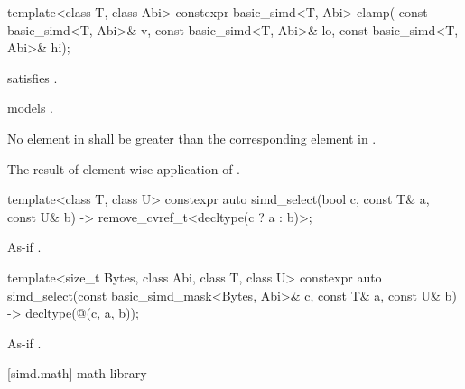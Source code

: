 \begin{itemdecl}
template<class T, class Abi>
  constexpr basic_simd<T, Abi> clamp(
    const basic_simd<T, Abi>& v, const basic_simd<T, Abi>& lo, const basic_simd<T, Abi>& hi);
\end{itemdecl}

\begin{itemdescr}
  \pnum\constraints
   satisfies .

  \pnum\expects
   models .

  \pnum\expects
  No element in  shall be greater than the corresponding element in .

  \pnum\returns
  The result of element-wise application of  \foralli.
\end{itemdescr}

\begin{itemdecl}
  template<class T, class U>
    constexpr auto simd_select(bool c, const T& a, const U& b)
    -> remove_cvref_t<decltype(c ? a : b)>;
\end{itemdecl}

\begin{itemdescr}
    \pnum\returns As-if .
\end{itemdescr}

\begin{itemdecl}
  template<size_t Bytes, class Abi, class T, class U>
    constexpr auto simd_select(const basic_simd_mask<Bytes, Abi>& c, const T& a, const U& b)
    -> decltype(@\simdselect@(c, a, b));
\end{itemdecl}

\begin{itemdescr}
    \pnum\returns As-if .
\end{itemdescr}

[simd.math]{ math library}

